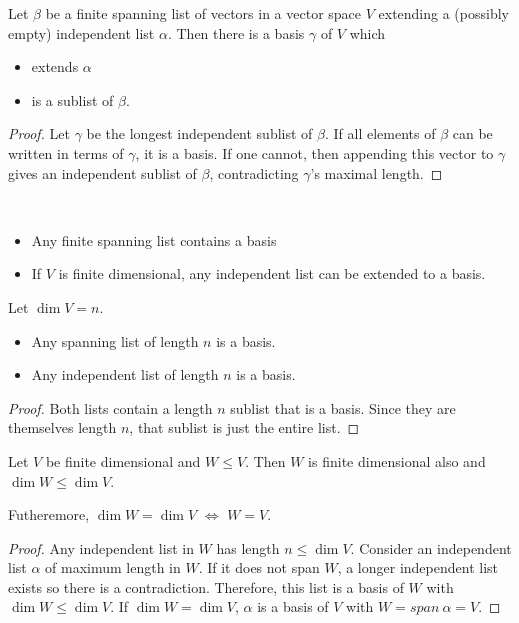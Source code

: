 \begin{theorem}
    Let $\beta$ be a finite spanning list of vectors in a vector space $V$ extending a (possibly empty) independent list $\alpha$. Then there is a basis $\gamma$ of $V$ which 
    \begin{itemize}
      \item extends $\alpha$
      \item is a sublist of $\beta$.
    \end{itemize}
\end{theorem}
\begin{proof}
     Let $\gamma$ be the longest independent sublist of $\beta$. If all elements of $\beta$ can be written in terms of $\gamma$, it is a basis. If one cannot, then appending this vector to $\gamma$ gives an independent sublist of $\beta$, contradicting $\gamma$'s maximal length.
\end{proof}

\begin{corollary} $ $
  \begin{itemize}
    \item Any finite spanning list contains a basis
    \item If $V$ is finite dimensional, any independent list can be extended to a basis.
  \end{itemize}
    
\end{corollary}

\begin{corollary}
    Let $\dim V = n$.
    \begin{itemize}
      \item Any spanning list of length $n$ is a basis.
      \item Any independent list of length $n$ is a basis.
    \end{itemize}
\end{corollary}
\begin{proof}
    Both lists contain a length $n$ sublist that is a basis. Since they are themselves length $n$, that sublist is just the entire list.
\end{proof}

\begin{theorem}
    Let $V$ be finite dimensional and $W \leq V$. Then $W$ is finite dimensional also and $\dim W \leq \dim V$.

    Futheremore, $\dim W = \dim V$ $\iff$ $W = V$.
\end{theorem}
\begin{proof}
    Any independent list in $W$ has length $n \leq \dim V$. Consider an independent list $\alpha$ of maximum length in $W$. If it does not span $W$, a longer independent list exists so there is a contradiction. Therefore, this list is a basis of $W$ with $\dim W \leq \dim V$. If $\dim W = \dim V$, $\alpha$ is a basis of $V$ with $W = span \ \alpha = V$.
\end{proof}

